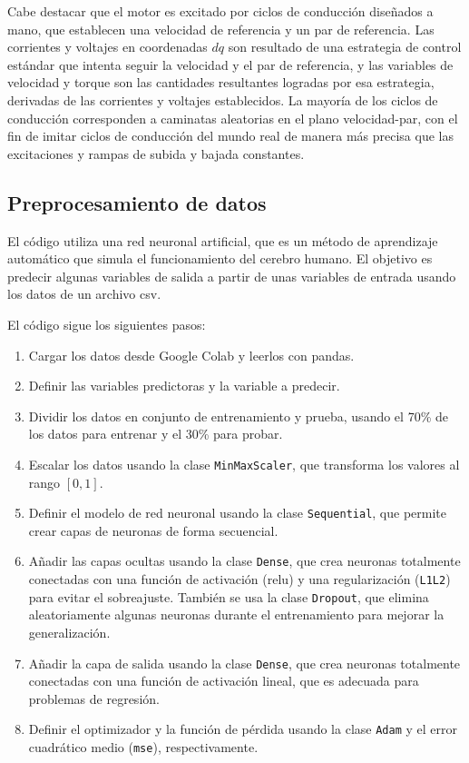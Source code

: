 \documentclass{article}
\begin{document}
Cabe destacar que el motor es excitado por ciclos de conducción diseñados a mano, que establecen una velocidad de referencia y un par de referencia. Las corrientes y voltajes en coordenadas $dq$ son resultado de una estrategia de control estándar que intenta seguir la velocidad y el par de referencia, y las variables de velocidad y torque son las cantidades resultantes logradas por esa estrategia, derivadas de las corrientes y voltajes establecidos. La mayoría de los ciclos de conducción corresponden a caminatas aleatorias en el plano velocidad-par, con el fin de imitar ciclos de conducción del mundo real de manera más precisa que las excitaciones y rampas de subida y bajada constantes.




\subsection{Preprocesamiento de datos}


El código utiliza una red neuronal artificial, que es un método de aprendizaje automático que simula el funcionamiento del cerebro humano. El objetivo es predecir algunas variables de salida a partir de unas variables de entrada  usando los datos de un archivo csv.

El código sigue los siguientes pasos:

\begin{enumerate}
\item Cargar los datos desde Google Colab y leerlos con pandas.
\item Definir las variables predictoras y la variable a predecir.
\item Dividir los datos en conjunto de entrenamiento y prueba, usando el 70\% de los datos para entrenar y el 30\% para probar.
\item Escalar los datos usando la clase \lstinline{MinMaxScaler}, que transforma los valores al rango $[0, 1]$.
\item Definir el modelo de red neuronal usando la clase \lstinline{Sequential}, que permite crear capas de neuronas de forma secuencial.
\item Añadir las capas ocultas usando la clase \lstinline{Dense}, que crea neuronas totalmente conectadas con una función de activación ($\text{relu}$) y una regularización (\lstinline{L1L2}) para evitar el sobreajuste. También se usa la clase \lstinline{Dropout}, que elimina aleatoriamente algunas neuronas durante el entrenamiento para mejorar la generalización.
\item Añadir la capa de salida usando la clase \lstinline{Dense}, que crea neuronas totalmente conectadas con una función de activación lineal, que es adecuada para problemas de regresión.
\item Definir el optimizador y la función de pérdida usando la clase \lstinline{Adam} y el error cuadrático medio (\lstinline{mse}), respectivamente.
\end{enumerate}
\end{document}
